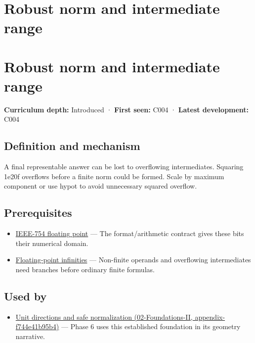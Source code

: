 \hypertarget{appendix-7f1e17dcafb1}{}
\section*{Robust norm and intermediate range}
\section{Robust norm and intermediate range}\label{appendix-7f1e17dcafb1-robust-norm-and-intermediate-range}

\textbf{Curriculum depth:} Introduced · \textbf{First seen:} C004 · \textbf{Latest development:} C004

\subsection{Definition and mechanism}\label{appendix-7f1e17dcafb1-definition-and-mechanism}

A final representable answer can be lost to overflowing intermediates. Squaring 1e20f overflows before a finite norm could be formed. Scale by maximum component or use hypot to avoid unnecessary squared overflow.

\subsection{Prerequisites}\label{appendix-7f1e17dcafb1-prerequisites}

\begin{itemize}
\tightlist
\item
  \hyperref[appendix-343615f49ddf]{IEEE-754 floating point} --- The format/arithmetic contract gives these bits their numerical domain.
\item
  \hyperref[appendix-eb336149c00a]{Floating-point infinities} --- Non-finite operands and overflowing intermediates need branches before ordinary finite formulas.
\end{itemize}

\subsection{Used by}\label{appendix-7f1e17dcafb1-used-by}

\begin{itemize}
\tightlist
\item
  \href{../02-Foundations-II/main.pdf\#nameddest=appendix-f744e41b95b4}{Unit directions and safe normalization (02-Foundations-II, appendix-f744e41b95b4)} --- Phase 6 uses this established foundation in its geometry narrative.
\end{itemize}


